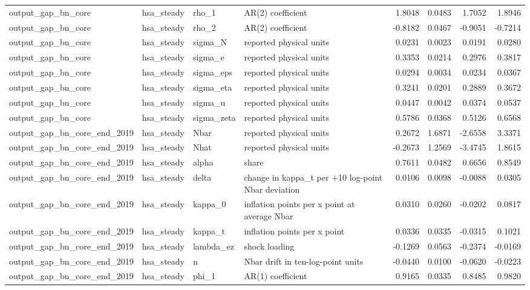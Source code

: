 \begin{tabular}{llllrrrr}
output\_gap\_bn\_core & hsa\_steady & rho\_1 & AR(2) coefficient & 1.8048 & 0.0483 & 1.7052 & 1.8946 \\
output\_gap\_bn\_core & hsa\_steady & rho\_2 & AR(2) coefficient & -0.8182 & 0.0467 & -0.9051 & -0.7214 \\
output\_gap\_bn\_core & hsa\_steady & sigma\_N & reported physical units & 0.0231 & 0.0023 & 0.0191 & 0.0280 \\
output\_gap\_bn\_core & hsa\_steady & sigma\_e & reported physical units & 0.3353 & 0.0214 & 0.2976 & 0.3817 \\
output\_gap\_bn\_core & hsa\_steady & sigma\_eps & reported physical units & 0.0294 & 0.0034 & 0.0234 & 0.0367 \\
output\_gap\_bn\_core & hsa\_steady & sigma\_eta & reported physical units & 0.3241 & 0.0201 & 0.2889 & 0.3672 \\
output\_gap\_bn\_core & hsa\_steady & sigma\_u & reported physical units & 0.0447 & 0.0042 & 0.0374 & 0.0537 \\
output\_gap\_bn\_core & hsa\_steady & sigma\_zeta & reported physical units & 0.5786 & 0.0368 & 0.5126 & 0.6568 \\
output\_gap\_bn\_core\_end\_2019 & hsa\_steady & Nbar & reported physical units & 0.2672 & 1.6871 & -2.6558 & 3.3371 \\
output\_gap\_bn\_core\_end\_2019 & hsa\_steady & Nhat & reported physical units & -0.2673 & 1.2569 & -3.4745 & 1.8615 \\
output\_gap\_bn\_core\_end\_2019 & hsa\_steady & alpha & share & 0.7611 & 0.0482 & 0.6656 & 0.8549 \\
output\_gap\_bn\_core\_end\_2019 & hsa\_steady & delta & change in kappa\_t per +10 log-point Nbar deviation & 0.0106 & 0.0098 & -0.0088 & 0.0305 \\
output\_gap\_bn\_core\_end\_2019 & hsa\_steady & kappa\_0 & inflation points per x point at average Nbar & 0.0310 & 0.0260 & -0.0202 & 0.0817 \\
output\_gap\_bn\_core\_end\_2019 & hsa\_steady & kappa\_t & inflation points per x point & 0.0336 & 0.0335 & -0.0315 & 0.1021 \\
output\_gap\_bn\_core\_end\_2019 & hsa\_steady & lambda\_ez & shock loading & -0.1269 & 0.0563 & -0.2374 & -0.0169 \\
output\_gap\_bn\_core\_end\_2019 & hsa\_steady & n & Nbar drift in ten-log-point units & -0.0440 & 0.0100 & -0.0620 & -0.0223 \\
output\_gap\_bn\_core\_end\_2019 & hsa\_steady & phi\_1 & AR(1) coefficient & 0.9165 & 0.0335 & 0.8485 & 0.9820 \\

\end{tabular}
